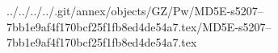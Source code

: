 ../../../../.git/annex/objects/GZ/Pw/MD5E-s5207--7bb1e9af4f170bcf25f1fb8ed4de54a7.tex/MD5E-s5207--7bb1e9af4f170bcf25f1fb8ed4de54a7.tex